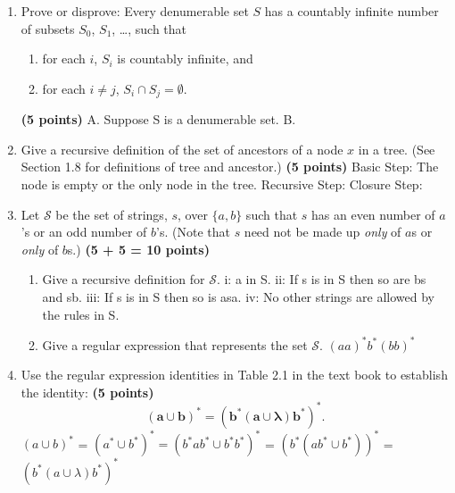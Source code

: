 \documentclass{article}
\begin{document}
\begin{enumerate}
  \item Prove or disprove: Every denumerable set $S$ has a countably
    infinite number of subsets $S_0$, $S_1$, \ldots, such that
    \begin{enumerate}
    \item for each $i$, $S_i$ is countably infinite, and
    \item for each $i \not= j$, $S_i \cap S_j = \emptyset$.
    \end{enumerate}
    \hfill{\textbf{(5 points)}}
    \newline A. Suppose S is a denumerable set.
    \newline B.

\item Give a recursive definition of the set of ancestors of a node
  $x$ in a tree. (See Section 1.8 for definitions of tree and
  ancestor.) \hfill{\textbf{(5 points)}}
  \newline Basic Step: The node is empty or the only node in the tree.
  \newline Recursive Step: 
  \newline Closure Step: 

\item Let $\mathcal{S}$ be the set of
    strings, $s$, over
    $\{a, b\}$ such that $s$ has an
    even number of $a$'s or an odd number of $b$'s. 
    (Note that $s$ need not be made up \emph{only} of $a$s or
    \emph{only} of $b$s.) \hfill{\textbf{(5 + 5 = 10 points)}}
    \begin{enumerate}

    \item Give a recursive definition for $\mathcal{S}$.
    \newline i: a in S.
    \newline ii: If s is in S then so are bs and sb.
    \newline iii: If s is in S then so is asa.
    \newline iv: No other strings are allowed by the rules in S.

    \item Give a regular expression that represents the set
      $\mathcal{S}$.
      \newline $(aa)^*b^*(bb)^*$

    \end{enumerate}
    
\item Use the regular expression identities in Table 2.1 in the text
  book to establish the identity: \hfill{\textbf{(5 points)}}
\[
\mathbf{(a \cup b)^*} = \mathbf{(b^*(a\cup \lambda)b^*)^*}.
\]
\newline $(a \cup b)^*$ = $(a^* \cup b^*)^* = (b^*ab^* \cup b^*b^*)^*$
\newline = $(b^*(ab^* \cup b^*))^*$
\newline = $(b^*(a\cup \lambda)b^*)^*$


\end{enumerate}
\end{document}
